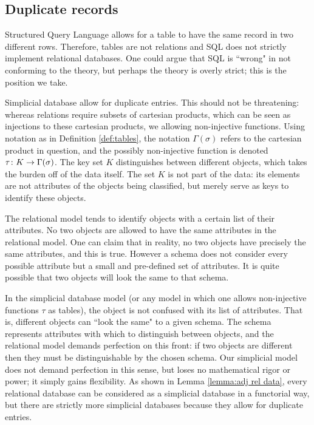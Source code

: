 \documentclass{amsart}
\begin{document}
\subsection{Duplicate records}\label{subsec:duplication}

Structured Query Language allows for a table to have the same record in two different rows.  Therefore, tables are not relations and SQL does not strictly implement relational databases.  One could argue that SQL is ``wrong" in not conforming to the theory, but perhaps the theory is overly strict; this is the position we take.  

Simplicial database allow for duplicate entries.  This should not be threatening: whereas relations require subsets of cartesian products, which can be seen as injections to these cartesian products, we allowing non-injective functions.  Using notation as in Definition \ref{def:tables}, the notation $\Gamma(\sigma)$ refers to the cartesian product in question, and the possibly non-injective function is denoted  $\tau\colon K\rightarrow\Gamma(\sigma)$.  The key set $K$ distinguishes between different objects, which takes the burden off of the data itself.  The set $K$ is not part of the data: its elements are not attributes of the objects being classified, but merely serve as keys to identify these objects.  

The relational model tends to identify objects with a certain list of their attributes.  No two objects are allowed to have the same attributes in the relational model.  One can claim that in reality, no two objects have precisely the same attributes, and this is true.  However a schema does not consider every possible attribute but a small and pre-defined set of attributes.  It is quite possible that two objects will look the same to that schema. 

In the simplicial database model (or any model in which one allows non-injective functions $\tau$ as tables), the object is not confused with its list of attributes.  That is, different objects can ``look the same" to a given schema.  The schema represents attributes with which to distinguish between objects, and the relational model demands perfection on this front: if two objects are different then they must be distinguishable by the chosen schema.  Our simplicial model does not demand perfection in this sense, but loses no mathematical rigor or power; it simply gains flexibility.  As shown in Lemma \ref{lemma:adj rel data}, every relational database can be considered as a simplicial database in a functorial way, but there are strictly more simplicial databases because they allow for duplicate entries.
\end{document}
